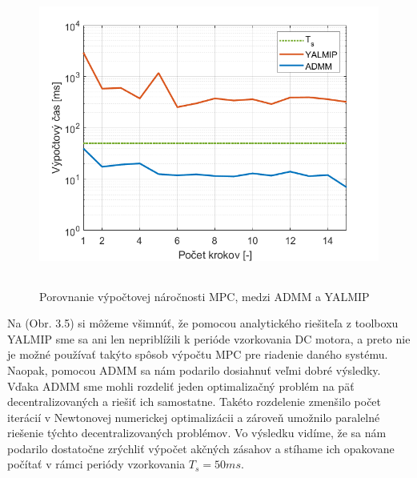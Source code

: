 \newpage
\begin{figure}[H]	
	\centering
	\includegraphics[width=13cm,height=10cm]{images/DC_motor/Vypoctovy_cas}
	\caption{Porovnanie výpočtovej náročnosti MPC, medzi ADMM a YALMIP}
	\label{fig9: VN}
\end{figure}
Na (Obr. 3.5) si môžeme všimnúť, že pomocou analytického riešiteľa z toolboxu YALMIP sme sa ani len nepriblížili k perióde vzorkovania DC motora, a preto nie je možné používať takýto spôsob výpočtu MPC pre riadenie daného systému. Naopak, pomocou ADMM sa nám podarilo dosiahnuť veľmi dobré výsledky. Vďaka ADMM sme mohli rozdeliť jeden optimalizačný problém na päť decentralizovaných a riešiť ich samostatne. Takéto rozdelenie zmenšilo počet iterácií v Newtonovej numerickej optimalizácii a zároveň umožnilo paralelné riešenie týchto decentralizovaných problémov. Vo výsledku vidíme, že sa nám podarilo dostatočne zrýchliť výpočet akčných zásahov a stíhame ich opakovane počítať v rámci periódy vzorkovania $T_{s} = 50ms$.